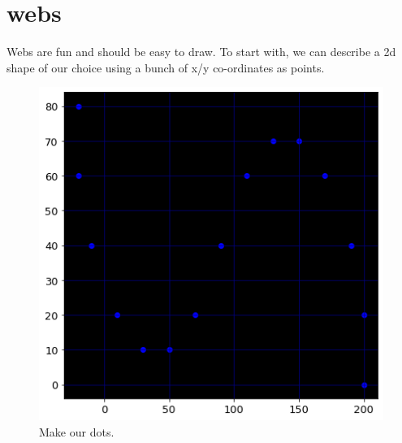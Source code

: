 \chapter{webs}
\label{sec:webs}
\lstset{style=68KStyle}

Webs are fun and should be easy to draw. To start with, we can describe a 2d shape
of our choice using a bunch of x/y co-ordinates as points.
\begin{figure}[H]
    \centering
    \begin{adjustbox}{width=7cm,center}
      \includegraphics[width=12cm]{src/webs/sine_wave_dots_no_title.png}%
    \end{adjustbox}
  \caption{Make our dots.}
\end{figure}

